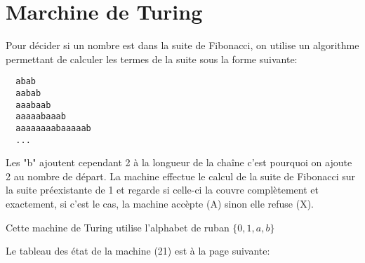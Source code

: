 \documentclass{article}
\begin{document}
\pagebreak

\section{Marchine de Turing}
Pour décider si un nombre est dans la suite de Fibonacci, on utilise un algorithme permettant de calculer les termes de la suite sous la forme suivante:
\begin{lstlisting}
  abab
  aabab
  aaabaab
  aaaaabaaab
  aaaaaaaabaaaaab
  ...
\end{lstlisting}
Les "b" ajoutent cependant 2 à la longueur de la chaîne c'est pourquoi on ajoute 2 au nombre de départ. La machine effectue le calcul de la suite de Fibonacci sur la suite préexistante de 1 et regarde si celle-ci la couvre complètement et exactement, si c'est le cas, la machine accèpte (A) sinon elle refuse (X).

Cette machine de Turing utilise l'alphabet de ruban $\{0, 1, a, b\}$

Le tableau des état de la machine (21) est à la page suivante:
\end{document}
